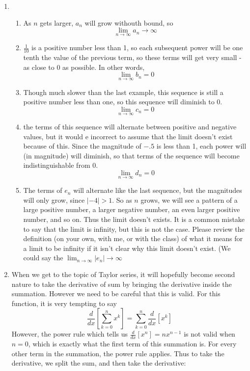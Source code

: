 \documentclass{article}
\begin{document}
    \begin{enumerate}
        \item 
        \begin{enumerate}[label=(\roman*)]
            \item As $n$ gets larger, $a_n$ will grow withouth bound, so
            \[\lim_{n\to\infty} a_n \to \infty\]
            \item $\frac{1}{10}$ is a positive number less than 1, so each subsequent power will be one tenth the value of the previous term, so these terms will get very small - as close to 0 as possible. In other words,
            \[\lim_{n\to\infty} b_n = 0\]
            \item Though much slower than the last example, this sequence is still a positive number less than one, so this sequence will diminish to 0.
            \[\lim_{n\to\infty} c_n =0\]
            \item the terms of this sequence will alternate between positive and negative values, but it would e incorrect to assume that the limit doesn't exist because of this.  Since the magnitude of $-.5$ is less than 1, each power will (in magnitude) will diminish, so that terms of the sequence will become indistinguishable from 0.
            \[\lim_{n\to \infty} d_n = 0\]
            \item The terms of $e_n$ will alternate like the last sequence, but the magnitudes will only grow, since $|-4|>1$.  So as $n$ grows, we will see a pattern of a large positive number, a larger negative number, an even larger positive number, and so on.  Thus the limit doesn't exists.  It is a common mistake to say that the limit is infinity, but this is not the case.  Please review the definition (on your own, with me, or with the class) of what it means for a limit to be infinity if it isn't clear why this limit doesn't exist.  (We could say the $\lim_{n\to\infty} |e_n|\to \infty$ 
        \end{enumerate}
        \item When we get to the topic of Taylor series, it will hopefully become second nature to take the derivative of sum by bringing the derivative inside the summation. However we need to be careful that this is valid.  For this function, it is very tempting to say
        \[\frac{d}{dx}\left[\sum_{k=0}^nx^k\right] =\sum_{k=0}^n\frac{d}{dx}\left[x^k\right] \]
        However, the power rule which tells us $\frac{d}{dx}[x^n]=nx^{n-1}$ is not valid when $n=0$, which is exactly what the first term of this summation is.  For every other term in the summation, the power rule applies.  Thus to take the derivative, we split the sum, and then take the derivative:

\end{enumerate}
\end{document}

